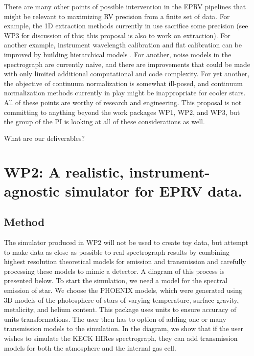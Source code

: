 \documentclass[12pt]{article}
\begin{document}
There are many other points of possible intervention in the EPRV pipelines that might be relevant to maximizing RV precision from a finite set of data.
For example, the 1D extraction methods currently in use sacrifice some precision (see WP3 for discussion of this; this proposal is also to work on extraction).
For another example, instrument wavelength calibration and flat calibration can be improved by building hierarchical models \cite{excalibur}.
For another, noise models in the spectrograph are currently na\"ive, and there are improvements that could be made with only limited additional computational and code complexity.
For yet another, the objective of continuum normalization is somewhat ill-posed, and continuum normalization methods currently in play might be inappropriate for cooler stars.
All of these points are worthy of research and engineering.
This proposal is not committing to anything beyond the work packages WP1, WP2, and WP3, but the group of the PI is looking at all of these considerations as well.

What are our deliverables?

\section{WP2: A realistic, instrument-agnostic simulator for EPRV data.}

\subsection{Method}
The simulator produced in WP2 will not be used to create toy data, but attempt to make data as close as possible to real spectrograph results by combining highest resolution theoretical models for emission and transmission and carefully processing these models to mimic a detector. A diagram of this process is presented below. To start the simulation, we need a model for the spectral emission of star. We choose the PHOENIX models, which were generated using 3D models of the photosphere of stars of varying temperature, surface gravity, metalicity, and helium content. This package uses  units to ensure accuracy of units transformations. The user then has to option of adding one or many transmission models to the simulation. In the diagram, we show that if the user wishes to simulate the KECK HIRes spectrograph, they can add transmission models for both the atmosphere and the internal gas cell. 
\end{document}
